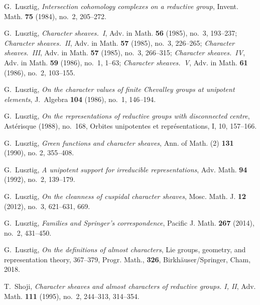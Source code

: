 \documentclass[eqthmnum,nocolour,skinny]{jt-calcs}
\begin{document}
\begin{thebibliography}{99}
{\sc G.~Lusztig}, \emph{Intersection cohomology complexes on a reductive group}, Invent. Math. {\bf 75} (1984), no.~2, 205--272.

{\sc G.~Lusztig}, \emph{Character sheaves.~I}, Adv. in Math. {\bf 56} (1985), no.~3, 193--237; \emph{Character sheaves.~II}, Adv. in Math. {\bf 57} (1985), no.~3, 226--265; \emph{Character sheaves.~III}, Adv. in Math. {\bf 57} (1985), no.~3, 266--315; \emph{Character sheaves.~IV}, Adv. in Math. {\bf 59} (1986), no.~1, 1--63; \emph{Character sheaves.~V}, Adv. in Math. {\bf 61} (1986), no.~2, 103--155.

{\sc G.~Lusztig}, \emph{On the character values of finite Chevalley groups at unipotent elements}, J.~Algebra {\bf 104} (1986), no.~1, 146--194.

{\sc G.~Lusztig}, \emph{On the representations of reductive groups with disconnected centre}, Ast\'erisque (1988), no.~168, Orbites unipotentes et repr\'esentations, I, 10, 157--166.

{\sc G.~Lusztig}, \emph{Green functions and character sheaves}, Ann. of Math. (2) {\bf 131} (1990), no. 2, 355--408.

{\sc G.~Lusztig}, \emph{A unipotent support for irreducible representations}, Adv. Math. {\bf 94} (1992), no.~2, 139--179.

{\sc G.~Lusztig}, \emph{On the cleanness of cuspidal character sheaves}, Mosc. Math. J. {\bf 12} (2012), no.~3, 621--631, 669.

{\sc G.~Lusztig}, \emph{Families and Springer's correspondence}, Pacific J. Math. {\bf 267} (2014), no.~2, 431--450.

{\sc G.~Lusztig}, \emph{On the definitions of almost characters}, Lie groups, geometry, and representation theory, 367--379, Progr. Math., {\bf 326}, Birkh\"{a}user/Springer, Cham, 2018.

{\sc T.~Shoji}, \emph{Character sheaves and almost characters of reductive groups. I, II}, Adv. Math. {\bf 111} (1995), no.~2, 244--313, 314--354.


\end{thebibliography}
\end{document}
